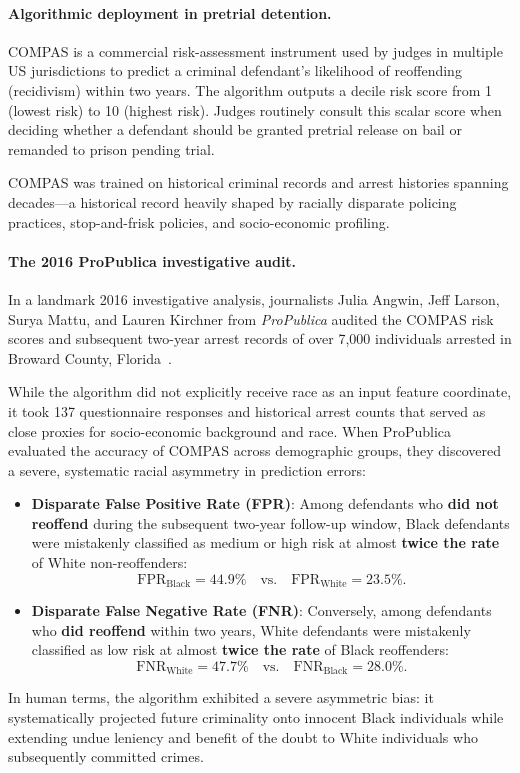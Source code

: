 \paragraph{Algorithmic deployment in pretrial detention.}
COMPAS is a commercial risk-assessment instrument used by judges in multiple US jurisdictions to predict a criminal defendant's likelihood of reoffending (recidivism) within two years. The algorithm outputs a decile risk score from 1 (lowest risk) to 10 (highest risk). Judges routinely consult this scalar score when deciding whether a defendant should be granted pretrial release on bail or remanded to prison pending trial.

COMPAS was trained on historical criminal records and arrest histories spanning decades—a historical record heavily shaped by racially disparate policing practices, stop-and-frisk policies, and socio-economic profiling.

\paragraph{The 2016 ProPublica investigative audit.}
In a landmark 2016 investigative analysis, journalists Julia Angwin, Jeff Larson, Surya Mattu, and Lauren Kirchner from \emph{ProPublica} audited the COMPAS risk scores and subsequent two-year arrest records of over 7,000 individuals arrested in Broward County, Florida~\cite{angwin2016machine}. 

While the algorithm did not explicitly receive race as an input feature coordinate, it took 137 questionnaire responses and historical arrest counts that served as close proxies for socio-economic background and race. When ProPublica evaluated the accuracy of COMPAS across demographic groups, they discovered a severe, systematic racial asymmetry in prediction errors:
\begin{itemize}
  \item \textbf{Disparate False Positive Rate (FPR)}: Among defendants who \textbf{did not reoffend} during the subsequent two-year follow-up window, Black defendants were mistakenly classified as medium or high risk at almost \textbf{twice the rate} of White non-reoffenders:
  \begin{equation}
  \text{FPR}_{\text{Black}} = 44.9\% \quad \text{vs.} \quad \text{FPR}_{\text{White}} = 23.5\%.
  \label{eq:compas_fpr}
  \end{equation}
  \item \textbf{Disparate False Negative Rate (FNR)}: Conversely, among defendants who \textbf{did reoffend} within two years, White defendants were mistakenly classified as low risk at almost \textbf{twice the rate} of Black reoffenders:
  \begin{equation}
  \text{FNR}_{\text{White}} = 47.7\% \quad \text{vs.} \quad \text{FNR}_{\text{Black}} = 28.0\%.
  \label{eq:compas_fnr}
  \end{equation}
\end{itemize}
In human terms, the algorithm exhibited a severe asymmetric bias: it systematically projected future criminality onto innocent Black individuals while extending undue leniency and benefit of the doubt to White individuals who subsequently committed crimes.

